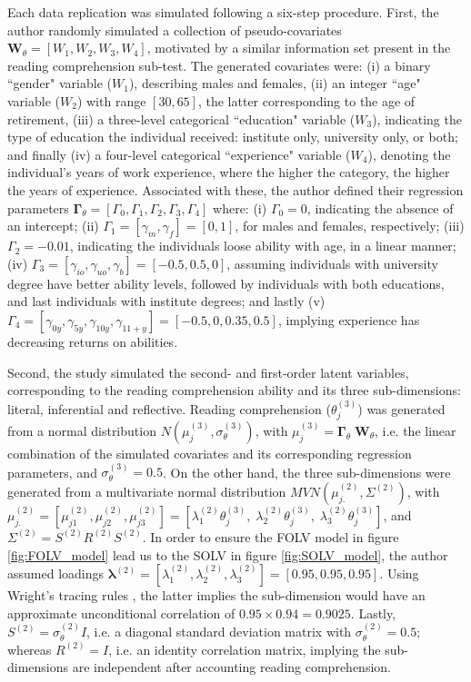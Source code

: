 Each data replication was simulated following a six-step procedure. First, the author randomly simulated a collection of pseudo-covariates $\mathbf{W}_{\theta} = [ W_{1}, W_{2}, W_{3}, W_{4} ]$, motivated by a similar information set present in the reading comprehension sub-test. The generated covariates were: (i) a binary ``gender" variable ($W_{1}$), describing males and females, (ii) an integer ``age" variable ($W_{2}$) with range $[30, 65]$, the latter corresponding to the age of retirement, (iii) a three-level categorical ``education" variable ($W_{3}$), indicating the type of education the individual received: institute only, university only, or both; and finally (iv) a four-level categorical ``experience" variable ($W_{4}$), denoting the individual's years of work experience, where the higher the category, the higher the years of experience. Associated with these, the author defined their regression parameters $\mathbf{\Gamma}_{\theta} = [\Gamma_{0}, \Gamma_{1}, \Gamma_{2}, \Gamma_{3}, \Gamma_{4}]$ where: (i) $\Gamma_{0} = 0$, indicating the absence of an intercept; (ii) $\Gamma_{1} = [\gamma_{m}, \gamma_{f}] = [0, 1]$, for males and females, respectively; (iii) $\Gamma_{2} = -0.01$, indicating the individuals loose ability with age, in a linear manner; (iv) $\Gamma_{3} = [\gamma_{io}, \gamma_{uo}, \gamma_{b}] = [-0.5, 0.5, 0]$, assuming individuals with university degree have better ability levels, followed by individuals with both educations, and last individuals with institute degrees; and lastly (v) $\Gamma_{4} = [\gamma_{0y}, \gamma_{5y}, \gamma_{10y}, \gamma_{11+y}] = [-0.5, 0, 0.35, 0.5]$, implying experience has decreasing returns on abilities.

Second, the study simulated the second- and first-order latent variables, corresponding to the reading comprehension ability and its three sub-dimensions: literal, inferential and reflective. Reading comprehension ($\theta^{(3)}_{j}$) was generated from a normal distribution $N( \mu^{(3)}_{j}, \sigma^{(3)}_{\theta} )$, with $\mu^{(3)}_{j} = \pmb{\Gamma}_{\theta} \; \mathbf{W}_{\theta}$, i.e. the linear combination of the simulated covariates and its corresponding regression parameters, and $\sigma^{(3)}_{\theta}=0.5$. On the other hand, the three sub-dimensions were generated from a multivariate normal distribution $MVN( \mu^{(2)}_{j.} , \Sigma^{(2)})$, with $\mu^{(2)}_{j.} = [\mu^{(2)}_{j1}, \mu^{(2)}_{j2}, \mu^{(2)}_{j3}] = [\lambda^{(2)}_{1} \theta^{(3)}_{j}, \; \lambda^{(2)}_{2} \theta^{(3)}_{j}, \; \lambda^{(2)}_{3} \theta^{(3)}_{j} ]$, and $\Sigma^{(2)} = S^{(2)} R^{(2)} S^{(2)}$. In order to ensure the FOLV model in figure \ref{fig:FOLV_model} lead us to the SOLV in figure \ref{fig:SOLV_model}, the author assumed loadings $\pmb{\lambda}^{(2)} = [\lambda^{(2)}_{1}, \lambda^{(2)}_{2}, \lambda^{(2)}_{3}] = [0.95, 0.95, 0.95]$. Using Wright's tracing rules \cite{Beaujean_2014}, the latter implies the sub-dimension would have an approximate unconditional correlation of $0.95 \times 0.94 = 0.9025$. Lastly, $S^{(2)} = \sigma^{(2)}_{\theta} I$, i.e. a diagonal standard deviation matrix with $\sigma^{(2)}_{\theta} = 0.5$; whereas $R^{(2)} = I$, i.e. an identity correlation matrix, implying the sub-dimensions are independent after accounting reading comprehension.

